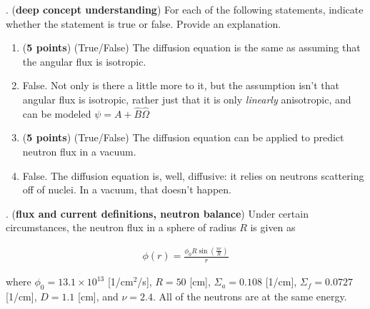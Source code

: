 \documentclass[11pt]{article}
\newcommand{\beq}{\begin{equation}\begin{aligned}}
\newcommand{\eeq}{\end{aligned}\end{equation}}
\newcommand{\ans}[1]{{\color{violet}#1}}
\begin{document}
\clearpage
{}. ({\bf deep concept understanding}) For each of the following statements, indicate whether the statement is true or false. Provide an explanation.

\begin{enumerate}
\item[(a)] ({\bf 5 points}) (True/False) The diffusion equation is the same as assuming that the angular flux is isotropic.
\item[] \ans{False. Not only is there a little more to it, but the assumption isn't that angular flux is isotropic, rather just that it is only \emph{linearly} anisotropic, and can be modeled $\psi=A+\hat{B}\hat{\Omega}$}
\item[(b)] ({\bf 5 points}) (True/False) The diffusion equation can be applied to predict neutron flux in a vacuum.
\item[] \ans{False. The diffusion equation is, well, diffusive: it relies on neutrons scattering off of nuclei. In a vacuum, that doesn't happen.}
\end{enumerate}

\clearpage
{}. ({\bf flux and current definitions, neutron balance}) Under certain circumstances, the neutron flux in a sphere of radius $R$ is given as 

\beq
\label{eq:flux}
\phi(r)=\frac{\phi_0R\sin{\left(\frac{\pi r}{R}\right)}}{r}
\eeq

where $\phi_0=13.1\times10^{13}$ [1/cm$^2$/s], $R=50$ [cm], $\Sigma_a=0.108$ [1/cm], $\Sigma_f=0.0727$ [1/cm], $D=1.1$ [cm], and $\nu=2.4$. All of the neutrons are at the same energy.
\end{document}
